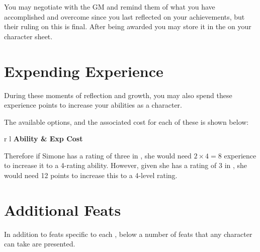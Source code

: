 	You may negotiate with the GM and remind them of what you have accomplished and overcome since you last reflected on your achievements, but their ruling on this is final. After being awarded  you may store it in the  on your character sheet. 
	
	
	\section{Expending Experience}
	
	During these moments of reflection and growth, you may also spend these experience points to increase your abilities as a character. 
	
	The available options, and the associated  cost for each of these is shown below:
	
	\begin{center}
		\begin{rndtable}{r l}
			\bf Ability	&	\bf Exp Cost
			\\
			\progressionCosts
		\end{rndtable}
	
	\end{center}
	
	Therefore if Simone has a rating of three in , she would need $2\times4 = 8$ experience to increase it to a 4-rating ability. However, given she has a rating of 3 in , she would need 12 points to increase this to a 4-level rating. 


	\section{Additional Feats} \label{S:AllFeats}
	
	In addition to feats specific to each , below a number of feats that any character can take are presented. 
	
	\newcommand\animal[2]{\imp{#1} & \parbox[t]{5cm}{\raggedright #2} \\}
	
	\AllFeats
